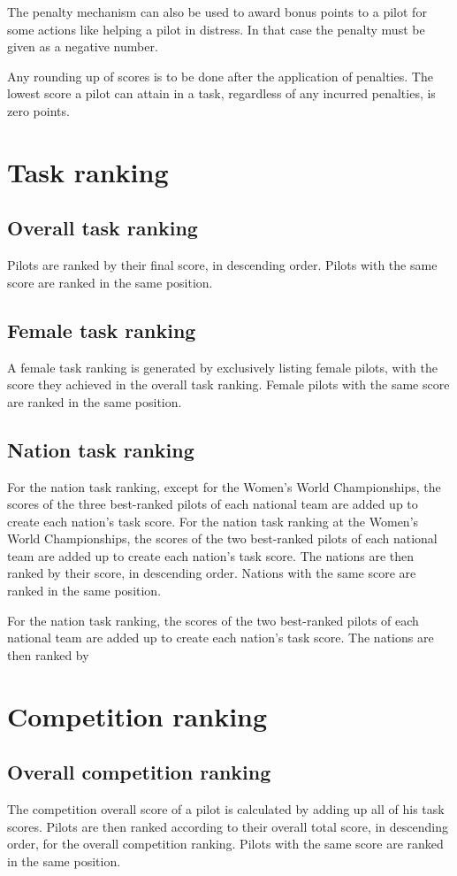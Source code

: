 \documentclass{article}
\begin{document}
The penalty mechanism can also be used to award bonus points to a pilot for
some actions like helping a pilot in distress. In that case the penalty must be
given as a negative number.

Any rounding up of scores is to be done after the application of penalties. The
lowest score a pilot can attain in a task, regardless of any incurred
penalties, is zero points.

\newpage
\section{Task ranking}
\subsection{Overall task ranking}
Pilots are ranked by their final score, in descending order. Pilots with the
same score are ranked in the same position.

\subsection{Female task ranking}
A female task ranking is generated by exclusively listing female pilots, with
the score they achieved in the overall task ranking. Female pilots with the
same score are ranked in the same position.

\subsection{Nation task ranking}
For the nation task ranking, except for the Women’s World Championships, the
scores of the three best-ranked pilots of each national team are added up to
create each nation’s task score. For the nation task ranking at the Women’s
World Championships, the scores of the two best-ranked pilots of each national
team are added up to create each nation’s task score. The nations are then
ranked by their score, in descending order. Nations with the same score are
ranked in the same position.

For the nation task ranking, the scores of the two best-ranked pilots of each
national team are added up to create each nation’s task score. The nations are
then ranked by

\newpage
\section{Competition ranking}
\subsection{Overall competition ranking}
The competition overall score of a pilot is calculated by adding up all of his
task scores. Pilots are then ranked according to their overall total score, in
descending order, for the overall competition ranking. Pilots with the same
score are ranked in the same position.
\end{document}
